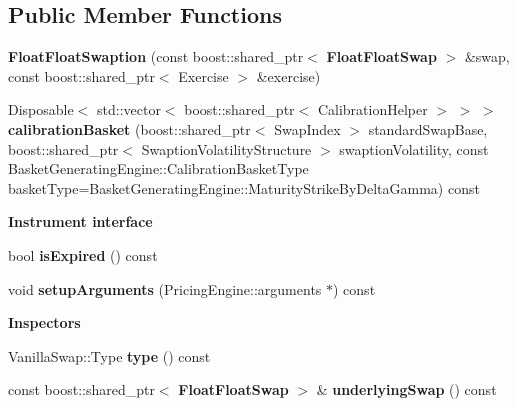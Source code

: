\subsection*{Public Member Functions}
\begin{DoxyCompactItemize}
\item 
{\bfseries Float\+Float\+Swaption} (const boost\+::shared\+\_\+ptr$<$ {\bf Float\+Float\+Swap} $>$ \&swap, const boost\+::shared\+\_\+ptr$<$ Exercise $>$ \&exercise)\label{class_quant_lib_1_1_float_float_swaption_a620398082db3c130b4bf407857fc8539}

\item 
Disposable$<$ std\+::vector$<$ boost\+::shared\+\_\+ptr$<$ Calibration\+Helper $>$ $>$ $>$ {\bfseries calibration\+Basket} (boost\+::shared\+\_\+ptr$<$ Swap\+Index $>$ standard\+Swap\+Base, boost\+::shared\+\_\+ptr$<$ Swaption\+Volatility\+Structure $>$ swaption\+Volatility, const Basket\+Generating\+Engine\+::\+Calibration\+Basket\+Type basket\+Type=Basket\+Generating\+Engine\+::\+Maturity\+Strike\+By\+Delta\+Gamma) const \label{class_quant_lib_1_1_float_float_swaption_a7661543d7888dd2f57eaf71779fdab43}

\end{DoxyCompactItemize}
\begin{Indent}{\bf Instrument interface}\par
\begin{DoxyCompactItemize}
\item 
bool {\bfseries is\+Expired} () const \label{class_quant_lib_1_1_float_float_swaption_a13307ca9a1fccbb57831a10483269953}

\item 
void {\bfseries setup\+Arguments} (Pricing\+Engine\+::arguments $\ast$) const \label{class_quant_lib_1_1_float_float_swaption_afbaf1f87b8e039e72541533dc904314a}

\end{DoxyCompactItemize}
\end{Indent}
\begin{Indent}{\bf Inspectors}\par
\begin{DoxyCompactItemize}
\item 
Vanilla\+Swap\+::\+Type {\bfseries type} () const \label{class_quant_lib_1_1_float_float_swaption_aefcb7f1aad5738a6998089507f60bceb}

\item 
const boost\+::shared\+\_\+ptr$<$ {\bf Float\+Float\+Swap} $>$ \& {\bfseries underlying\+Swap} () const \label{class_quant_lib_1_1_float_float_swaption_a83f90454396db67d352675847d95d55d}

\end{DoxyCompactItemize}
\end{Indent}


